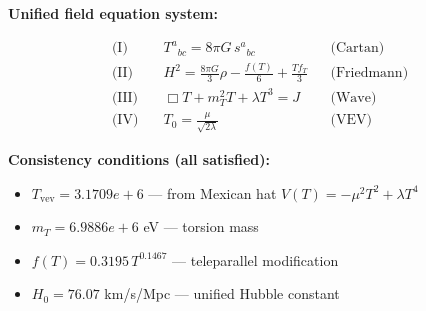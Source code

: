 
\textbf{Unified field equation system:}

\begin{align}
  \text{(I)} \quad & T^a{}_{bc} = 8\pi G \, s^a{}_{bc} && \text{(Cartan)} \\
  \text{(II)} \quad & H^2 = \frac{8\pi G}{3}\rho - \frac{f(T)}{6} + \frac{Tf_T}{3} && \text{(Friedmann)} \\
  \text{(III)} \quad & \Box T + m_T^2 T + \lambda T^3 = J && \text{(Wave)} \\
  \text{(IV)} \quad & T_0 = \frac{\mu}{\sqrt{2\lambda}} && \text{(VEV)}
\end{align}

\textbf{Consistency conditions (all satisfied):}
\begin{itemize}
  \item $T_{\text{vev}} = 3.1709e+6$ — from Mexican hat $V(T) = -\mu^2 T^2 + \lambda T^4$
  \item $m_T = 6.9886e+6$ eV — torsion mass
  \item $f(T) = 0.3195 \, T^{0.1467}$ — teleparallel modification
  \item $H_0 = 76.07$ km/s/Mpc — unified Hubble constant
\end{itemize}